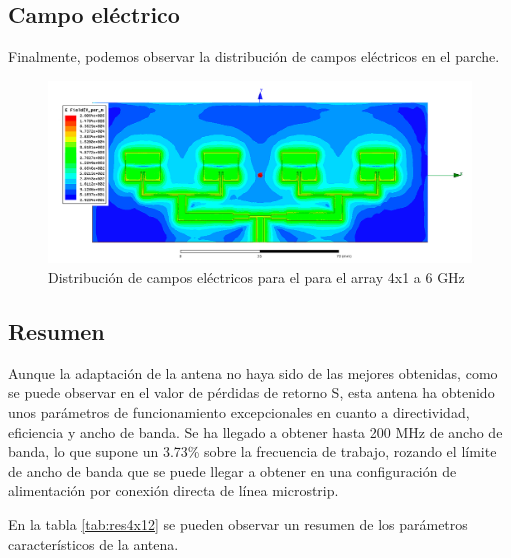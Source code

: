 \subsection{Campo eléctrico}
\par Finalmente, podemos observar la distribución de campos eléctricos en el parche. 

\begin{figure}[H]
    \centering
        \includegraphics[width=\textwidth]{archivos/analisis/4x12/8}
        \caption{Distribución de campos eléctricos para el para el array 4x1 a 6 GHz}
        \label{fig:elec4x12}
\end{figure}

\subsection{Resumen}
\par Aunque la adaptación de la antena no haya sido de las mejores obtenidas, como se puede observar en el valor de pérdidas de retorno S, esta antena ha obtenido unos parámetros de funcionamiento excepcionales en cuanto a directividad, eficiencia y ancho de banda. Se ha llegado a obtener hasta 200 MHz de ancho de banda, lo que supone un 3.73\% sobre la frecuencia de trabajo, rozando el límite de ancho de banda que se puede llegar a obtener en una configuración de alimentación por conexión directa de línea microstrip.
\\
\par En la tabla \ref{tab:res4x12} se pueden observar un resumen de los parámetros característicos de la antena.

